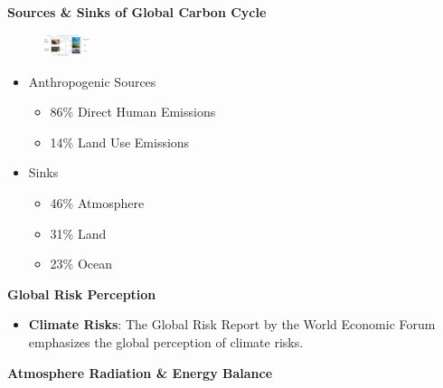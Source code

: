 \documentclass[fontsize=8pt, a4paper, landscape, fleqn]{scrartcl}
\renewcommand{\section}[1]{%
    \noindent\colorbox{sectioncolor}{%
        \parbox{\dimexpr\columnwidth-2\fboxsep}{\color{white}\textbf{#1}}}%
    \vspace{0.5mm}%
}
\renewcommand{\subsection}[1]{%
    \noindent\colorbox{subsectioncolor}{%
        \parbox{\dimexpr\columnwidth-2\fboxsep}{\color{white}\textbf{#1}}}%
    \vspace{0.5mm}%
}
\begin{document}
\begin{multicols*}{3}[\raggedcolumns]
\subsection{Sources \& Sinks of Global Carbon Cycle}
\begin{figure}
    \centering
    \includegraphics[width=0.12\textwidth]{Secondary/img/Pasted image 20250407172833.png}
\end{figure}
\begin{itemize}
    \item Anthropogenic Sources
        \begin{itemize}
            \item 86\% Direct Human Emissions
            \item 14\% Land Use Emissions
        \end{itemize}
    \item Sinks
        \begin{itemize}
            \item 46\% Atmosphere
            \item 31\% Land
            \item 23\% Ocean
        \end{itemize}
\end{itemize}

\subsection{Global Risk Perception}
\begin{itemize}
    \item \textbf{Climate Risks}: The Global Risk Report by the World Economic Forum emphasizes the global perception of climate risks.
\end{itemize}
\section{Atmosphere Radiation \& Energy Balance}

\end{multicols*}
\end{document}
